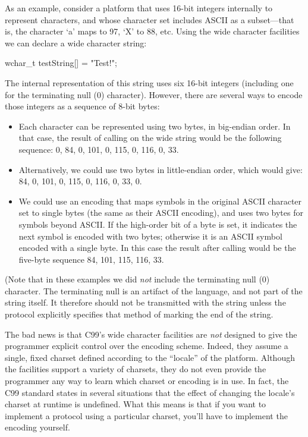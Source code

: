 As an example, consider a platform that uses 16-bit
integers internally to represent characters, and whose character set includes
ASCII as a subset---that is, the character `a' maps to 97, `X' to 88,
etc.  Using the wide character facilities we can declare a wide
character string:
\begin{inlinecode}
  wchar_t testString[] = "Test!";
\end{inlinecode}
The internal representation of this string uses six 16-bit integers
(including one for the terminating null (0) character).
However, there are several ways to encode those integers as a sequence
of 8-bit bytes:
\begin{itemize}
\item
Each character can be represented using two bytes, in big-endian
order.  In that case, the result of calling  on
the wide string  would be the following sequence:
 0, 84, 0, 101, 0, 115, 0, 116, 0, 33.
\item
Alternatively, we could use two bytes in little-endian order,
which would give: 84, 0, 101, 0, 115, 0, 116, 0, 33, 0.
\item
We could use an encoding that maps symbols in the original
ASCII character set to single bytes (the same as their ASCII
encoding), and uses two bytes for symbols beyond ASCII.
If the high-order bit of a byte is set, it indicates the
next symbol is encoded with two bytes; otherwise it is an ASCII symbol
encoded with a single byte.  In this case the result after calling
 would be the five-byte sequence 84, 101, 115, 116, 33. 
\end{itemize}
(Note that in these examples we did \emph{not\/} include the terminating
null (0) character.  The terminating null is an artifact of the
language, and not part of the string itself. It therefore should not
be transmitted with the string unless the protocol explicitly specifies that
method of marking the end of the string.

The bad news is that C99's wide character facilities
are \emph{not\/} designed to
give the programmer explicit control over the encoding scheme. Indeed,
they assume a single, fixed charset defined according to the
``locale'' of the platform.
Although the facilities support a variety of charsets, they do not
even provide the programmer any way to learn which charset or encoding
is in use.  In fact, the C99 standard states in several situations
that the effect of changing the locale's charset at runtime is undefined.
%
What this means is that if you want to implement a protocol using a
particular charset, you'll have to implement the encoding yourself.

